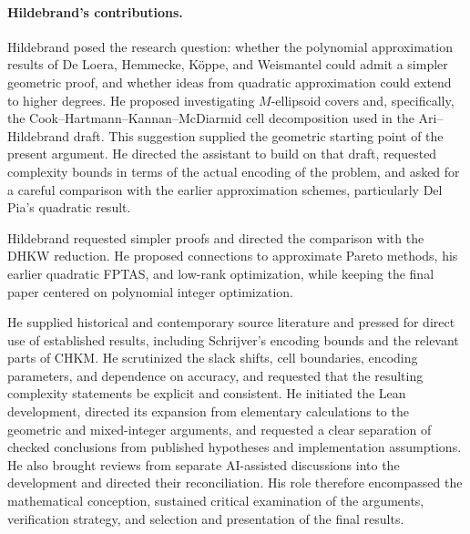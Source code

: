\documentclass[11pt]{article}
\theoremstyle{definition}\newtheorem{definition}{Definition}[section]
\theoremstyle{remark}\newtheorem{remark}[theorem]{Remark}
\begin{document}
\paragraph{Hildebrand's contributions.}
Hildebrand posed the research question: whether the polynomial approximation results of De Loera, Hemmecke, K\"oppe, and Weismantel could admit a simpler geometric proof, and whether ideas from quadratic approximation could extend to higher degrees. He proposed investigating $M$-ellipsoid covers and, specifically, the Cook--Hartmann--Kannan--McDiarmid cell decomposition used in the Ari--Hildebrand draft. This suggestion supplied the geometric starting point of the present argument. He directed the assistant to build on that draft, requested complexity bounds in terms of the actual encoding of the problem, and asked for a careful comparison with the earlier approximation schemes, particularly Del Pia's quadratic result.

Hildebrand requested simpler proofs and directed the comparison with the DHKW reduction. He proposed connections to approximate Pareto methods, his earlier quadratic FPTAS, and low-rank optimization, while keeping the final paper centered on polynomial integer optimization.

He supplied historical and contemporary source literature and pressed for direct use of established results, including Schrijver's encoding bounds and the relevant parts of CHKM. He scrutinized the slack shifts, cell boundaries, encoding parameters, and dependence on accuracy, and requested that the resulting complexity statements be explicit and consistent. He initiated the Lean development, directed its expansion from elementary calculations to the geometric and mixed-integer arguments, and requested a clear separation of checked conclusions from published hypotheses and implementation assumptions. He also brought reviews from separate AI-assisted discussions into the development and directed their reconciliation. His role therefore encompassed the mathematical conception, sustained critical examination of the arguments, verification strategy, and selection and presentation of the final results.
\end{document}
